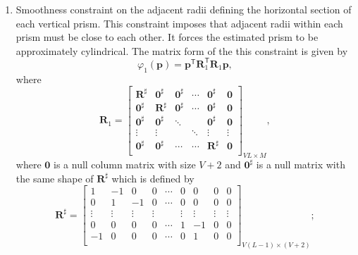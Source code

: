 \begin{enumerate}
\item Smoothness constraint on the adjacent radii defining the horizontal section of each vertical prism. This constraint imposes that adjacent radii within each prism must be close to each other. It forces the estimated prism to be approximately cylindrical. %
The matrix form of the this constraint is given by
\begin{equation}\label{eq:phi1m}
\varphi_{1}(\mathbf{p}) = \mathbf{p}^\mathsf{T}\mathbf{R}^\mathsf{T}_{1}\mathbf{R}_{1}\mathbf{p},
\end{equation}
where 
\begin{equation}
\mathbf{R}_{1} = 
\begin{bmatrix}
\mathbf{R}^{\sharp} & \mathbf{0}^{\sharp} & \mathbf{0}^{\sharp} & \cdots & \mathbf{0}^{\sharp} & \mathbf{0} \\
\mathbf{0}^{\sharp} & \textbf{R}^{\sharp} & \mathbf{0}^{\sharp} &  \cdots & \mathbf{0}^{\sharp} & \mathbf{0}\\
\mathbf{0}^{\sharp} & \mathbf{0}^{\sharp} & \ddots &  & \mathbf{0}^{\sharp} & \mathbf{0}\\
\vdots & \vdots &  & \ddots & \vdots & \vdots\\
\mathbf{0}^{\sharp} & \mathbf{0}^{\sharp} &  \cdots & \cdots & \mathbf{R}^{\sharp} & \mathbf{0}\\
\end{bmatrix}_{VL\times M},
\end{equation}
where $\mathbf{0}$ is a null column matrix with size $V+2$ and $\mathbf{0}^{\sharp}$ is a null matrix with the same shape of $\mathbf{R}^{\sharp}$ which is defined by 
\begin{equation}
\mathbf{R}^{\sharp} = 
\begin{bmatrix}
1 & -1 & 0 & 0 & \cdots & 0 & 0 & 0 & 0 \\
0 & 1 & -1 & 0 & \cdots & 0 & 0 & 0 & 0 \\
\vdots & \vdots & \vdots & \vdots & & \vdots & \vdots & \vdots & \vdots \\
0 & 0 & 0 & 0 & \cdots & 1 & -1 & 0 & 0 \\
-1 & 0 & 0 & 0 & \cdots & 0 & 1 & 0 & 0 \\
\end{bmatrix}_{V(L-1)\times (V+2)};
\end{equation}



\end{enumerate}
